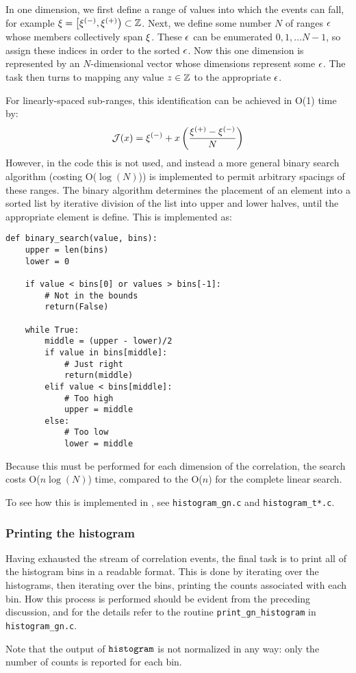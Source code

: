 In one dimension, we first define a range of values into which the events can fall, for example $\xi=\left[\xi^{(-)},\xi^{(+)}\right)\subset\mathbb{Z}$. Next, we define some number $N$ of ranges $\epsilon$ whose members collectively span $\xi$. These $\epsilon$ can be enumerated $0,1,\ldots N-1$, so assign these indices in order to the sorted $\epsilon$. Now this one dimension is represented by an $N$-dimensional vector whose dimensions represent some $\epsilon$. The task then turns to mapping any value $z\in\mathbb{Z}$ to the appropriate $\epsilon$.

For linearly-spaced sub-ranges, this identification can be achieved in O(1) time by:
\begin{equation}
\mathcal{J}(x) = \xi^{(-)} + x\left( \frac{\xi^{(+)}-\xi^{(-)}}{N} \right)
\end{equation}
However, in the code this is not used, and instead a more general binary search algorithm (costing O($\log(N)$)) is implemented to permit arbitrary spacings of these ranges. The binary algorithm determines the placement of an element into a sorted list by iterative division of the list into upper and lower halves, until the appropriate element is define. This is implemented as:
\begin{lstlisting}
def binary_search(value, bins):
    upper = len(bins)
    lower = 0
    
    if value < bins[0] or values > bins[-1]:
        # Not in the bounds
        return(False)
     
    while True:
        middle = (upper - lower)/2
        if value in bins[middle]:
            # Just right
            return(middle)
        elif value < bins[middle]:
            # Too high
            upper = middle
        else:
            # Too low
            lower = middle
\end{lstlisting}
Because this must be performed for each dimension of the correlation, the search costs O($n\log{(N)}$) time, compared to the O($n$) for the complete linear search. 

To see how this is implemented in , see \texttt{histogram\_gn.c} and \texttt{histogram\_t*.c}. 

\subsubsection{Printing the histogram}
Having exhausted the stream of correlation events, the final task is to print all of the histogram bins in a readable format. This is done by iterating over the histograms, then iterating over the bins, printing the counts associated with each bin. How this process is performed should be evident from the preceding discussion, and for the details refer to the routine \texttt{print\_gn\_histogram} in \texttt{histogram\_gn.c}.

Note that the output of $\texttt{histogram}$ is not normalized in any way: only the number of counts is reported for each bin.

